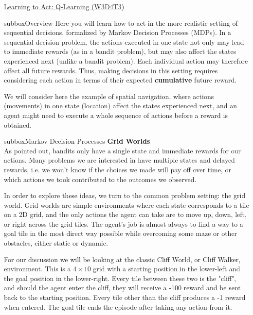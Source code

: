 \begin{textbox}{\href{https://compneuro.neuromatch.io/tutorials/W3D4_ReinforcementLearning/student/W3D4_Tutorial3.html}{Learning to Act: Q-Learning (W3D4T3)} }

\begin{subbox}{subbox}{Overview}
\scriptsize
Here you will learn how to act in the more realistic setting of sequential decisions, formalized by Markov Decision Processes (MDPs). In a sequential decision problem, the actions executed in one state not only may lead to immediate rewards (as in a bandit problem), but may also affect the states experienced next (unlike a bandit problem). Each individual action may therefore affect all future rewards. Thus, making decisions in this setting requires considering each action in terms of their expected \textbf{cumulative} future reward.

We will consider here the example of spatial navigation, where actions (movements) in one state (location) affect the states experienced next, and an agent might need to execute a whole sequence of actions before a reward is obtained.


\end{subbox}

\begin{subbox}{subbox}{Markov Decision Processes}
\scriptsize
\textbf{Grid Worlds}\\

As pointed out, bandits only have a single state and immediate rewards for our actions. Many problems we are interested in have multiple states and delayed rewards, i.e. we won't know if the choices we made will pay off over time, or which actions we took contributed to the outcomes we observed.

In order to explore these ideas, we turn to the common problem setting: the grid world. Grid worlds are simple environments where each state corresponds to a tile on a 2D grid, and the only actions the agent can take are to move up, down, left, or right across the grid tiles. The agent's job is almost always to find a way to a goal tile in the most direct way possible while overcoming some maze or other obstacles, either static or dynamic.

For our discussion we will be looking at the classic Cliff World, or Cliff Walker, environment. This is a $4 \times 10$ grid with a starting position in the lower-left and the goal position in the lower-right. Every tile between these two is the "cliff", and should the agent enter the cliff, they will receive a -100 reward and be sent back to the starting position. Every tile other than the cliff produces a -1 reward when entered. The goal tile ends the episode after taking any action from it.


\end{subbox}
\end{textbox}
